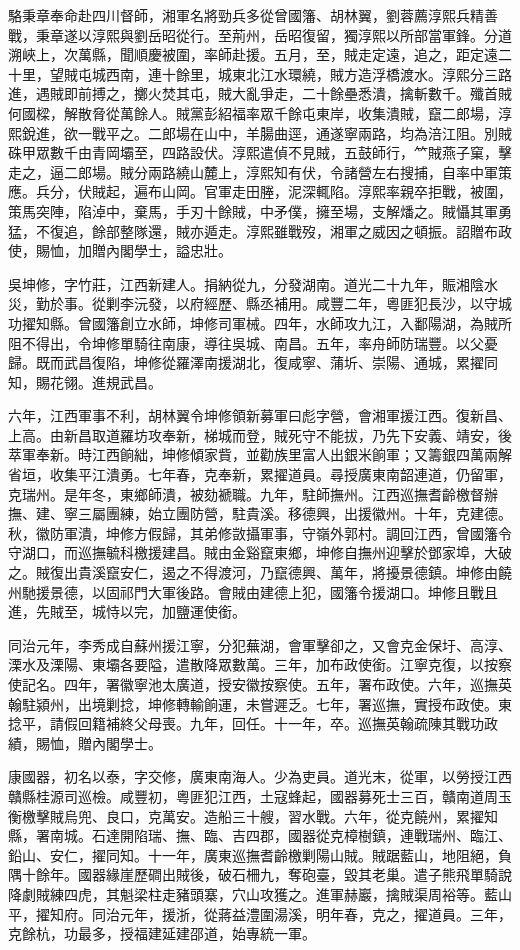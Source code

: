 \begin{pinyinscope}
駱秉章奉命赴四川督師，湘軍名將勁兵多從曾國籓、胡林翼，劉蓉薦淳熙兵精善戰，秉章遂以淳熙與劉岳昭從行。至荊州，岳昭復留，獨淳熙以所部當軍鋒。分道溯峽上，次萬縣，聞順慶被圍，率師赴援。五月，至，賊走定遠，追之，距定遠二十里，望賊屯城西南，連十餘里，城東北江水環繞，賊方造浮橋渡水。淳熙分三路進，遇賊即前搏之，擲火焚其屯，賊大亂爭走，二十餘壘悉潰，擒斬數千。殲首賊何國樑，解散脅從萬餘人。賊黨彭紹福率眾千餘屯東岸，收集潰賊，竄二郎場，淳熙銳進，欲一戰平之。二郎場在山中，羊腸曲逕，通遂寧兩路，均為涪江阻。別賊硃甲眾數千由青岡壩至，四路設伏。淳熙遣偵不見賊，五鼓師行，𥫗賊燕子窠，擊走之，逼二郎場。賊分兩路繞山麓上，淳熙知有伏，令諸營左右搜捕，自率中軍策應。兵分，伏賊起，遍布山岡。官軍走田塍，泥深輒陷。淳熙率親卒拒戰，被圍，策馬突陣，陷淖中，棄馬，手刃十餘賊，中矛僕，擁至場，支解燔之。賊懾其軍勇猛，不復追，餘部整隊還，賊亦遁走。淳熙雖戰歿，湘軍之威因之頓振。詔贈布政使，賜恤，加贈內閣學士，謚忠壯。

吳坤修，字竹莊，江西新建人。捐納從九，分發湖南。道光二十九年，賑湘陰水災，勤於事。從剿李沅發，以府經歷、縣丞補用。咸豐二年，粵匪犯長沙，以守城功擢知縣。曾國籓創立水師，坤修司軍械。四年，水師攻九江，入鄱陽湖，為賊所阻不得出，令坤修單騎往南康，導往吳城、南昌。五年，率舟師防瑞豐。以父憂歸。既而武昌復陷，坤修從羅澤南援湖北，復咸寧、蒲圻、崇陽、通城，累擢同知，賜花翎。進規武昌。

六年，江西軍事不利，胡林翼令坤修領新募軍曰彪字營，會湘軍援江西。復新昌、上高。由新昌取道羅坊攻奉新，梯城而登，賊死守不能拔，乃先下安義、靖安，後萃軍奉新。時江西餉絀，坤修傾家貲，並勸族里富人出銀米餉軍；又籌銀四萬兩解省垣，收集平江潰勇。七年春，克奉新，累擢道員。尋授廣東南韶連道，仍留軍，克瑞州。是年冬，東鄉師潰，被劾褫職。九年，駐師撫州。江西巡撫耆齡檄督辦撫、建、寧三屬團練，始立團防營，駐貴溪。移德興，出援徽州。十年，克建德。秋，徽防軍潰，坤修方假歸，其弟修敳攝軍事，守嶺外郭村。調回江西，曾國籓令守湖口，而巡撫毓科檄援建昌。賊由金谿竄東鄉，坤修自撫州迎擊於鄧家埠，大破之。賊復出貴溪竄安仁，遏之不得渡河，乃竄德興、萬年，將擾景德鎮。坤修由饒州馳援景德，以固祁門大軍後路。會賊由建德上犯，國籓令援湖口。坤修且戰且進，先賊至，城恃以完，加鹽運使銜。

同治元年，李秀成自蘇州援江寧，分犯蕪湖，會軍擊卻之，又會克金保圩、高淳、溧水及溧陽、東壩各要隘，遣散降眾數萬。三年，加布政使銜。江寧克復，以按察使記名。四年，署徽寧池太廣道，授安徽按察使。五年，署布政使。六年，巡撫英翰駐潁州，出境剿捻，坤修轉輸餉運，未嘗遲乏。七年，署巡撫，實授布政使。東捻平，請假回籍補終父母喪。九年，回任。十一年，卒。巡撫英翰疏陳其戰功政績，賜恤，贈內閣學士。

康國器，初名以泰，字交修，廣東南海人。少為吏員。道光末，從軍，以勞授江西贛縣桂源司巡檢。咸豐初，粵匪犯江西，土寇蜂起，國器募死士三百，贛南道周玉衡檄擊賊烏兜、良口，克萬安。造船三十艘，習水戰。六年，從克饒州，累擢知縣，署南城。石達開陷瑞、撫、臨、吉四郡，國器從克樟樹鎮，連戰瑞州、臨江、鉛山、安仁，擢同知。十一年，廣東巡撫耆齡檄剿陽山賊。賊踞藍山，地阻絕，負隅十餘年。國器緣崖歷磵出賊後，破石柵九，奪砲臺，毀其老巢。遣子熊飛單騎說降劇賊練四虎，其魁梁柱走豬頭寨，穴山攻獲之。進軍赫巖，擒賊渠周裕等。藍山平，擢知府。同治元年，援浙，從蔣益澧圍湯溪，明年春，克之，擢道員。三年，克餘杭，功最多，授福建延建邵道，始專統一軍。


\end{pinyinscope}
